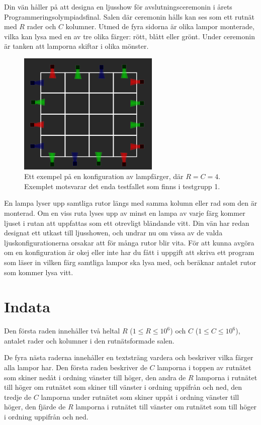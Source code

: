 Din vän håller på att designa en ljusshow för avslutningsceremonin i årets Programmeringsolympiadsfinal.
Salen där ceremonin hålls kan ses som ett rutnät med $R$ rader och $C$ kolumner.
Utmed de fyra sidorna är olika lampor monterade, vilka kan lysa med en av tre olika färger: rött, blått eller grönt.
Under ceremonin är tanken att lamporna skiftar i olika mönster.

\begin{figure}[h]
    \centering
    \includegraphics[width=0.6\textwidth]{affischbild}
    \caption{Ett exempel på en konfiguration av lampfärger, där $R = C = 4$. Exemplet motsvarar det enda testfallet som finns i testgrupp 1.}
\end{figure}

En lampa lyser upp samtliga rutor längs med samma kolumn eller rad som den är monterad.
Om en viss ruta lyses upp av minst en lampa av varje färg kommer ljuset i rutan att uppfattas som ett otrevligt bländande vitt.
Din vän har redan designat ett utkast till ljusshowen, och undrar nu om vissa av de valda ljuskonfigurationerna orsakar att för många rutor blir vita.
För att kunna avgöra om en konfiguration är okej eller inte har du fått i uppgift att skriva ett program som läser in vilken färg samtliga lampor ska lysa med, och beräknar antalet rutor som kommer lysa vitt.

\section*{Indata}
Den första raden innehåller två heltal $R$ ($1 \le R \le 10^6$) och $C$ ($1 \le C \le 10^6$), antalet rader och kolumner i den rutnätsformade salen.

De fyra nästa raderna innehåller en textsträng vardera och beskriver vilka färger alla lampor har.
Den första raden beskriver de $C$ lamporna i toppen av rutnätet som skiner nedåt i ordning vänster till höger,
    den andra de $R$ lamporna i rutnätet till höger om rutnätet som skiner till vänster i ordning uppifrån och ned,
    den tredje de $C$ lamporna under rutnätet som skiner uppåt i ordning vänster till höger,
    den fjärde de $R$ lamporna i rutnätet till vänster om rutnätet som till höger i ordning uppifrån och ned.

